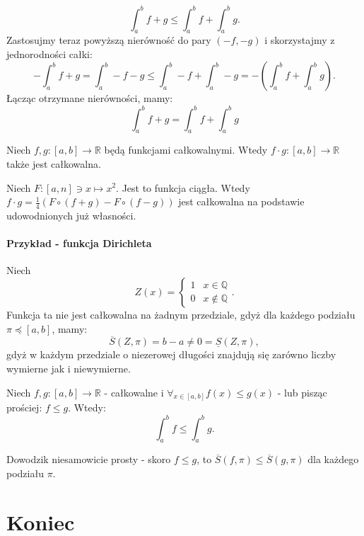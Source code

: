 \documentclass{article}
\numberwithin{defi}{section}
\numberwithin{defi}{section}
\newcommand{\R}{\mathbb{R}}
\newcommand{\Q}{\mathbb{Q}}
\newcommand{\Sd}{\underline{S}}
\newcommand{\Sg}{\overline{S}}
\renewcommand{\leq}{\leqslant}
\begin{document}
\begin{dow}{}
\begin{equation*}
        \int_{a}^{b} f + g \leq \int_{a}^{b} f +  \int_{a}^{b} g.
    \end{equation*} Zastosujmy teraz powyższą nierówność do pary $(-f, -g)$ i skorzystajmy z jednorodności całki: \begin{equation}
        -\int_{a}^{b} f + g = \int_{a}^{b} -f - g \leq \int_{a}^{b} -f   + \int_{a}^{b} -g =-(\int_{a}^{b} f   + \int_{a}^{b} g).
    \end{equation} Łącząc otrzymane nierówności, mamy: \begin{equation*}
        \int_{a}^{b} f + g = \int_{a}^{b} f   + \int_{a}^{b} g
    \end{equation*}

\end{dow}



\begin{twier}{}
    Niech $f, g: [a, b] \to \R$ będą funkcjami całkowalnymi. Wtedy $f \cdot g: [a, b] \to \R$ także jest całkowalna.
\end{twier}

\begin{dow}{}
    Niech $F: [a, n] \ni x \mapsto x^2$. Jest to funkcja ciągła. Wtedy $ f \cdot g = \frac{1}{4}( F \circ (f + g) - F \circ (f - g))$ jest całkowalna na podstawie udowodnionych już własności. 
\end{dow}


\paragraph{Przykład - funkcja Dirichleta}
    Niech \begin{equation}
        Z (x) = \begin{cases}
            1 & x \in \Q \\
            0 & x \notin \Q
        \end{cases}.
    \end{equation} Funkcja ta nie jest całkowalna na żadnym przedziale, gdyż dla każdego podziału $\pi \preceq [a, b]$, mamy: \begin{equation}
        \Sg(Z, \pi ) = b - a \neq 0 = \Sd(Z, \pi),
    \end{equation} gdyż w każdym przedziale o niezerowej długości znajdują się zarówno liczby wymierne jak i niewymierne.

\begin{twier}{}
    Niech $f, g: [a, b]  \to \R$ - całkowalne i $\forall_{x \in [a, b]} f(x) \leq g(x)$ - lub pisząc prościej: $f \leq g$. Wtedy: \begin{equation}
        \int_{a}^{b} f \leq \int_{a}^{b} g.
    \end{equation}
\end{twier}

\begin{dow}{}
    Dowodzik niesamowicie prosty - skoro $f \leq g$, to $\Sg(f, \pi) \leq \Sg(g, \pi)$ dla każdego podziału $\pi$. %
\end{dow}








\newpage
\section*{Koniec}
\newpage
\tableofcontents
\end{document}
